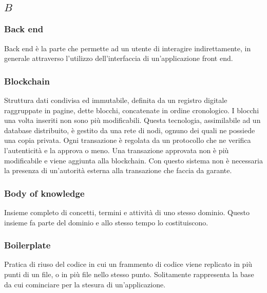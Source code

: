 \subsection*{\quad$B\quad$}
\subsubsection*{Back end}
Back end è la parte che permette ad un utente di interagire indirettamente, in generale attraverso l’utilizzo dell'interfaccia di un'applicazione front end.

\subsubsection*{Blockchain}
Struttura dati condivisa ed immutabile, definita da un registro digitale raggruppate in pagine, dette blocchi, concatenate in ordine cronologico. I blocchi una volta inseriti non sono più modificabili. Questa tecnologia, assimilabile ad un database distribuito, è gestito da una rete di nodi, ognuno dei quali ne possiede una copia privata. Ogni transazione è regolata da un protocollo che ne verifica l'autenticità e la approva o meno. Una transazione approvata non è più modificabile e viene aggiunta alla blockchain. Con questo sistema non è necessaria la presenza di un'autorità esterna alla transazione che faccia da garante.

\subsubsection*{Body of knowledge}
Insieme completo di concetti, termini e attività di uno stesso dominio. Questo insieme fa parte del dominio e allo stesso tempo lo costituiscono.

\subsubsection*{Boilerplate}
Pratica di riuso del codice in cui un frammento di codice viene replicato in più punti di un file, o in più file nello stesso punto. Solitamente rappresenta la base da cui cominciare per la stesura di un'applicazione. 

